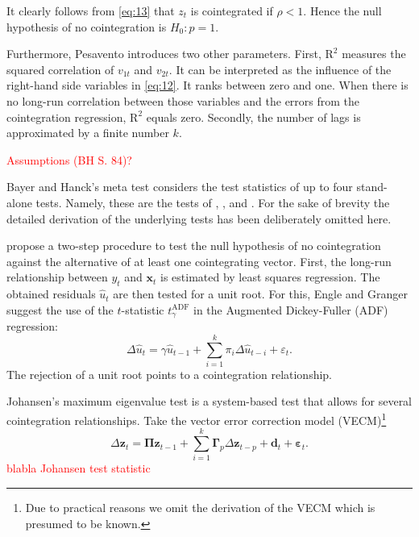 \documentclass[12pt,a4paper]{article}
\let\rmarkdownfootnote\footnote%
\def\footnote{\protect\rmarkdownfootnote}
\begin{document}
It clearly follows from \eqref{eq:13} that \(z_t\) is cointegrated if
\(\rho < 1\). Hence the null hypothesis of no cointegration is
\(H_0: p = 1\).

Furthermore, Pesavento introduces two other parameters. First,
\(\text{R}^2\) measures the squared correlation of \(v_{1t}\) and
\(v_{2t}\). It can be interpreted as the influence of the right-hand
side variables in \eqref{eq:12}. It ranks between zero and one. When
there is no long-run correlation between those variables and the errors
from the cointegration regression, \(\text{R}^2\) equals zero. Secondly,
the number of lags is approximated by a finite number \(k\).

\textcolor{red}{Assumptions (BH S. 84)?}

Bayer and Hanck's \autocite*{Bayerhanck_2012} meta test considers the
test statistics of up to four stand-alone tests. Namely, these are the
tests of \textcite{Englegranger_1987}, \textcite{Johansen_1988},
\textcite{Boswijk_1994} and \textcite{Banerjee_1998}. For the sake of
brevity the detailed derivation of the underlying tests has been
deliberately omitted here.

\textcite{Englegranger_1987} propose a two-step procedure to test the
null hypothesis of no cointegration against the alternative of at least
one cointegrating vector. First, the long-run relationship between
\(y_t\) and \(\mathbf{x}_t\) is estimated by least squares regression.
The obtained residuals \(\hat{u}_t\) are then tested for a unit root.
For this, Engle and Granger suggest the use of the \(t\)-statistic
\(t^{\text{ADF}}_\gamma\) in the Augmented Dickey-Fuller (ADF)
regression: \begin{equation}
\Delta \hat{u}_t = \gamma \hat{u}_{t-1} + \sum^{k}_{i=1} \pi_i \Delta \hat{u}_{t-i} + \varepsilon_t.
\label{eq:2}
\end{equation} The rejection of a unit root points to a cointegration
relationship.

Johansen's \autocite*{Johansen_1988} maximum eigenvalue test is a
system-based test that allows for several cointegration relationships.
Take the vector error correction model (VECM)\footnote{Due to practical
  reasons we omit the derivation of the VECM which is presumed to be
  known.} \begin{equation}
\Delta \mathbf{z}_t = \mathbf{\Pi z}_{t-1} + \sum^{k}_{i = 1} \mathbf{\Gamma}_p \Delta \mathbf{z}_{t-p} + \mathbf{d}_t + \mathbf{\varepsilon}_t.
\label{eq:3}
\end{equation} \textcolor{red}{blabla Johansen test statistic}
\end{document}

